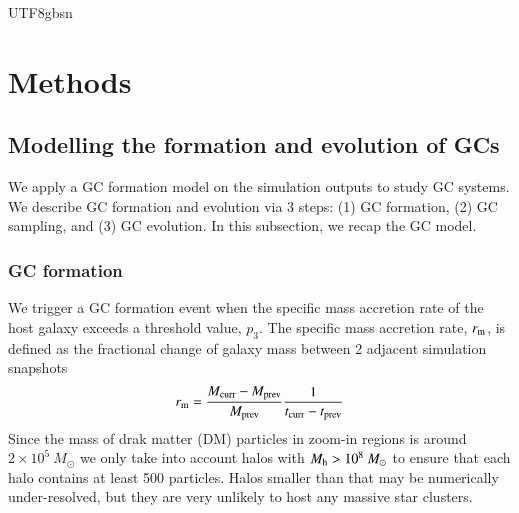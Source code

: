\documentclass[trackchanges, twocolappendix, twocolumn]{aastex701}
\begin{document}
\begin{CJK*}{UTF8}{gbsn}

\section{Methods} \label{sect:methods}

\subsection{Modelling the formation and evolution of GCs} \label{subsect:model}

We apply a GC formation model on the simulation outputs to study GC systems. We describe GC formation and evolution via 3 steps: (1) GC formation, (2) GC sampling, and (3) GC evolution. In this subsection, we recap the GC model.

\subsubsection{GC formation} \label{subsubsect:form}

We trigger a GC formation event when the specific mass accretion rate of the host galaxy exceeds a threshold value, $p_3$. The specific mass accretion rate, $r_{\rm m}$, is defined as the fractional change of galaxy mass between 2 adjacent simulation snapshots
\begin{align}
r_{\rm m} = \dfrac{M_{\rm curr} - M_{\rm prev}}{M_{\rm prev}} \dfrac{1}{t_{\rm curr} - t_{\rm prev}}
\end{align}
Since the mass of drak matter (DM) particles in zoom-in regions is around $2 \times 10^5~M_\odot$ we only take into account halos with $M_{\rm h} > 10^8~M_\odot$ to ensure that each halo contains at least 500 particles. Halos smaller than that may be numerically under-resolved, but they are very unlikely to host any massive star clusters.


\end{CJK*}
\end{document}
